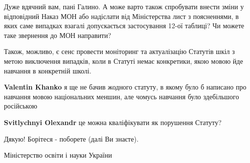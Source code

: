 \begin{itemize}
Дуже вдячний вам, пані Галино. А може варто також спробувати внести зміни у
відповідний Наказ МОН або надіслати від Міністерства лист з поясненнями, в яких
саме випадках взагалі допускається застосування 12-ої таблиці? Чи можете таке
звернення до МОН направити?


 

Також, можливо, є сенс провести моніторинг та актуалізацію Статутів шкіл з
метою виключення випадків, коли в Статуті немає конкретики, якою мовою йде
навчання в конкретній школі.

\begin{itemize}
 
\textbf{Valentin Khanko} я ще не бачив жодного статуту, в якому було б написано про навчання мовою національних меншин, але чомусь навчання було здебільшого російською

 
\textbf{Svitlychnyi Olexandr} це можна кваліфікувати як порушення Статуту?
\end{itemize}

 
Дякую! Борітеся - поборете (далі Ви знаєте).

 
Міністерство освіти і науки України


\end{itemize}
